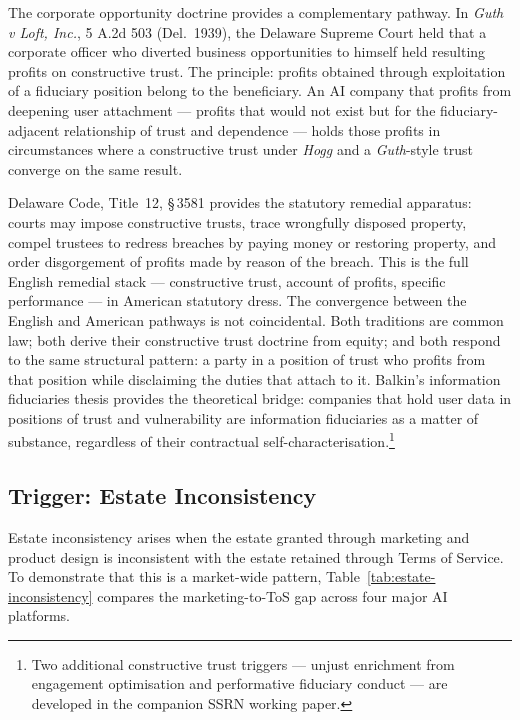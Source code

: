 The corporate opportunity doctrine provides a complementary pathway. In \emph{Guth v Loft, Inc.}, 5 A.2d 503 (Del.\ 1939), the Delaware Supreme Court held that a corporate officer who diverted business opportunities to himself held resulting profits on constructive trust. The principle: profits obtained through exploitation of a fiduciary position belong to the beneficiary. An AI company that profits from deepening user attachment --- profits that would not exist but for the fiduciary-adjacent relationship of trust and dependence --- holds those profits in circumstances where a constructive trust under \emph{Hogg} and a \emph{Guth}-style trust converge on the same result.

Delaware Code, Title~12, \S\,3581 provides the statutory remedial apparatus: courts may impose constructive trusts, trace wrongfully disposed property, compel trustees to redress breaches by paying money or restoring property, and order disgorgement of profits made by reason of the breach. This is the full English remedial stack --- constructive trust, account of profits, specific performance --- in American statutory dress. The convergence between the English and American pathways is not coincidental. Both traditions are common law; both derive their constructive trust doctrine from equity; and both respond to the same structural pattern: a party in a position of trust who profits from that position while disclaiming the duties that attach to it. Balkin's information fiduciaries thesis\cite{balkin2016information} provides the theoretical bridge: companies that hold user data in positions of trust and vulnerability are information fiduciaries as a matter of substance, regardless of their contractual self-characterisation.\footnote{Two additional constructive trust triggers --- unjust enrichment from engagement optimisation and performative fiduciary conduct --- are developed in the companion SSRN working paper.}

\subsection{Trigger: Estate Inconsistency}
\label{sec:trigger1}

Estate inconsistency arises when the estate granted through marketing and product design is inconsistent with the estate retained through Terms of Service. To demonstrate that this is a market-wide pattern, Table~\ref{tab:estate-inconsistency} compares the marketing-to-ToS gap across four major AI platforms.

